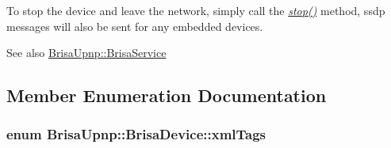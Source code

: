 To stop the device and leave the network, simply call the {\itshape \hyperlink{classBrisaUpnp_1_1BrisaDevice_af42bba26bf50a602e55a5d4836501362}{stop()}\/} method, ssdp messages will also be sent for any embedded devices.

\begin{DoxySeeAlso}{See also}
\hyperlink{classBrisaUpnp_1_1BrisaService}{BrisaUpnp::BrisaService} 
\end{DoxySeeAlso}


\subsection{Member Enumeration Documentation}
\hypertarget{classBrisaUpnp_1_1BrisaDevice_a4c9c16e6c1aa08b4e9ca5b81a26abca1}{
\subsubsection[{xmlTags}]{\setlength{\rightskip}{0pt plus 5cm}enum {\bf BrisaUpnp::BrisaDevice::xmlTags}}}
\label{classBrisaUpnp_1_1BrisaDevice_a4c9c16e6c1aa08b4e9ca5b81a26abca1}
